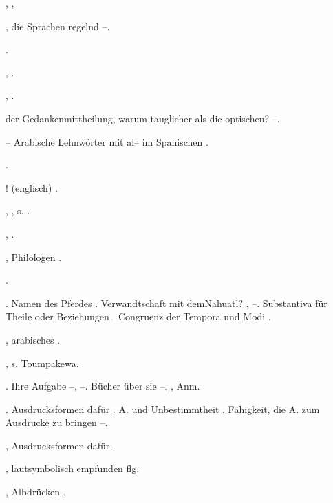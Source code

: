 \begin{register}

, \pageref{sp.149}, 

, die Sprachen regelnd \pageref{sp.125}–\pageref{sp.126}. 

 \pageref{sp.177}.

 \pageref{sp.18}, \pageref{sp.389}.

 \pageref{sp.150}, \pageref{sp.282}.

 der Gedankenmittheilung, warum tauglicher als die optischen? \pageref{sp.311}–\pageref{sp.312}.


– Arabische Lehnwörter mit al– im Spanischen \pageref{sp.266}.

 \pageref{sp.303}.

! (englisch) \pageref{sp.360}.

, , s. .

 \pageref{sp.147}, \pageref{sp.383}.

, Philologen \pageref{sp.21}.

 \pageref{sp.162}.

. Namen des Pferdes \pageref{sp.41}. Verwandtschaft mit demNahuatl? \pageref{sp.147}, \sed{\pageref{sp.152},} \pageref{sp.172}–\pageref{sp.173}.  Substantiva für Theile oder Beziehungen \pageref{sp.441}. Congruenz der Tempora und Modi \pageref{sp.466}.

, arabisches \pageref{sp.157}.

, s. Toumpakewa.

. Ihre Aufgabe \pageref{sp.11}–\pageref{sp.12}, \pageref{sp.302}–\pageref{sp.303}. Bücher über sie \pageref{sp.48}–\pageref{sp.49}, \pageref{sp.52}, Anm.

. Ausdrucksformen dafür \pageref{sp.95}. A. und Unbestimmtheit \pageref{sp.326}. Fähigkeit, die A. zum Ausdrucke zu bringen \pageref{sp.446}–\pageref{sp.447}.

, Ausdrucksformen dafür \pageref{sp.95}.

, lautsymbolisch empfunden \pageref{sp.220} flg.

, Albdrücken \pageref{sp.127}.


\end{register}
